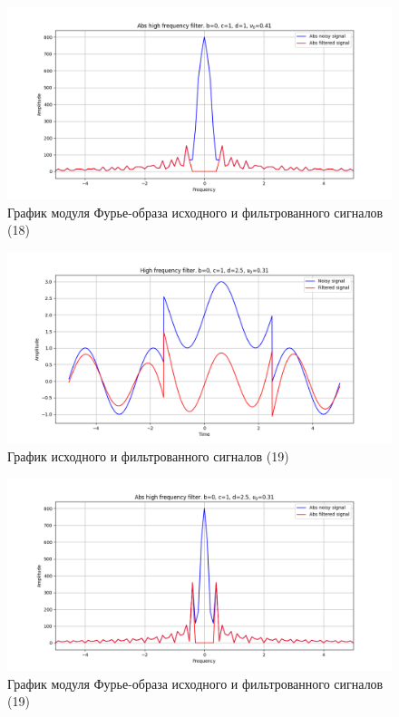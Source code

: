 \documentclass[a4paper, 12pt]{article}
\begin{document}
    \begin{figure}[!htb]
        \centering
        \includegraphics[scale=0.48]{18_abs_u_U_nolow.png}
        \captionsetup{skip=0pt}
        \caption{График модуля Фурье-образа исходного и фильтрованного сигналов (18)}
        \label{fig:fig62}
    \end{figure}
    \begin{figure}[!htb]
        \centering
        \includegraphics[scale=0.48]{19_u_flt_u_nolow.png}
        \captionsetup{skip=0pt}
        \caption{График исходного и фильтрованного сигналов (19)}
        \label{fig:fig63}
    \end{figure}
    \begin{figure}[!htb]
        \centering
        \includegraphics[scale=0.48]{19_abs_u_U_nolow.png}
        \captionsetup{skip=0pt}
        \caption{График модуля Фурье-образа исходного и фильтрованного сигналов (19)}
        \label{fig:fig64}
    \end{figure}
\end{document}
